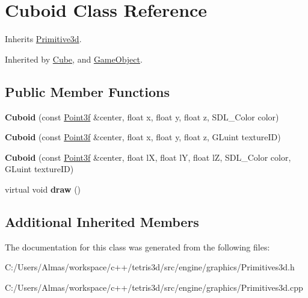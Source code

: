 \hypertarget{class_cuboid}{\section{Cuboid Class Reference}
\label{class_cuboid}
}


Inherits \hyperlink{class_primitive3d}{Primitive3d}.



Inherited by \hyperlink{class_cube}{Cube}, and \hyperlink{class_game_object}{Game\-Object}.

\subsection*{Public Member Functions}
\begin{DoxyCompactItemize}
\item 
\hypertarget{class_cuboid_ae04cd9f967c7964ee06a265c4631a664}{{\bfseries Cuboid} (const \hyperlink{struct_point3f}{Point3f} \&center, float x, float y, float z, S\-D\-L\-\_\-\-Color color)}\label{class_cuboid_ae04cd9f967c7964ee06a265c4631a664}

\item 
\hypertarget{class_cuboid_ada8580d21775a563e324175fda55e3e6}{{\bfseries Cuboid} (const \hyperlink{struct_point3f}{Point3f} \&center, float x, float y, float z, G\-Luint texture\-I\-D)}\label{class_cuboid_ada8580d21775a563e324175fda55e3e6}

\item 
\hypertarget{class_cuboid_a43cc4b64f1b7d8d2425ce79fda575c79}{{\bfseries Cuboid} (const \hyperlink{struct_point3f}{Point3f} \&center, float l\-X, float l\-Y, float l\-Z, S\-D\-L\-\_\-\-Color color, G\-Luint texture\-I\-D)}\label{class_cuboid_a43cc4b64f1b7d8d2425ce79fda575c79}

\item 
\hypertarget{class_cuboid_a1d3a7d9f952796e7319a01e6c84d4b8c}{virtual void {\bfseries draw} ()}\label{class_cuboid_a1d3a7d9f952796e7319a01e6c84d4b8c}

\end{DoxyCompactItemize}
\subsection*{Additional Inherited Members}


The documentation for this class was generated from the following files\-:\begin{DoxyCompactItemize}
\item 
C\-:/\-Users/\-Almas/workspace/c++/tetris3d/src/engine/graphics/Primitives3d.\-h\item 
C\-:/\-Users/\-Almas/workspace/c++/tetris3d/src/engine/graphics/Primitives3d.\-cpp\end{DoxyCompactItemize}
